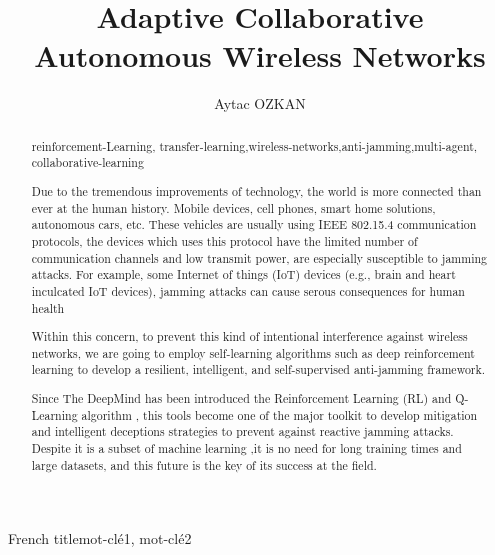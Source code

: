 \documentclass[letterpaper%
, twoside%
, 12pt%
,thesepararticles%
, english%
,creativecommons,hyperref, withAlgo2e%
]{thETS}
\title{Adaptive Collaborative  Autonomous Wireless Networks}
\author{Aytac OZKAN}
\begin{document}

\maketitle

\presentjury

\begin{foreword}

\lipsum[1] %

\end{foreword}



\begin{acknowledgements}

\lipsum[1] %


\end{acknowledgements}



\begin{summary}{French title}{mot-clé1, mot-clé2}

\lipsum[1] %

\end{summary}


\begin{abstract}{reinforcement-Learning, transfer-learning,wireless-networks,anti-jamming,multi-agent, collaborative-learning}

Due to the tremendous improvements of technology, the world is more connected than ever at the human history. Mobile devices, cell phones, smart home solutions, autonomous cars, etc. These vehicles are usually using IEEE 802.15.4 communication protocols, the devices which uses this protocol have the limited number of communication channels and low transmit power, are especially susceptible to jamming attacks. For example, some Internet of things (IoT) devices (e.g., brain and heart inculcated IoT devices), jamming attacks can cause serous consequences for human health

Within this concern, to prevent this kind of intentional interference against wireless networks, we are going to employ self-learning algorithms such as deep reinforcement learning to develop a resilient, intelligent, and self-supervised anti-jamming framework.

 Since The DeepMind has been introduced the Reinforcement Learning (RL) and Q-Learning algorithm \cite{ACM:HasseltetSilver}, this tools become one of the major toolkit to develop mitigation and intelligent deceptions strategies to prevent against reactive jamming attacks. Despite it is a subset of machine learning \cite{Kasturi2020MachineLR},it is no need for long training times and large datasets, and this future is the key of its success at the field. 

\end{abstract}
\end{document}
